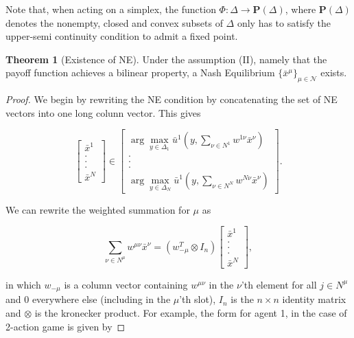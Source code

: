 \documentclass{article}
\theoremstyle{definition}
\newtheorem{theorem}{Theorem}
\newcommand{\agentset}{\mathcal{N}}
\begin{document}
  Note that, when acting on a simplex, the function $\Phi: \Delta \rightarrow \textbf{P}(\Delta)$, where $\textbf{P}(\Delta)$ denotes the nonempty, closed and convex subsets of $\Delta$ only has to satisfy the upper-semi continuity condition to admit a fixed point.

  \begin{theorem}[Existence of NE]
    Under the assumption (II), namely that the payoff function achieves a bilinear property, a
    Nash Equilibrium $\{\bar{x}^\mu\}_{\mu \in \agentset}$ exists.
  \end{theorem}

  \begin{proof}
    We begin by rewriting the NE condition by concatenating the set of NE vectors into one long colunn vector. This gives

    \begin{equation}
      \begin{bmatrix}
        \bar{x}^1 \\ . \\ . \\ . \\ \bar{x}^N
      \end{bmatrix} \in
      \begin{bmatrix}
      \arg\max_{y \in \Delta_1} \bar{u}^1(y, \sum_{\nu \in N^1} w^{1 \nu} \bar{x}^\nu) \\ . \\ . \\ . \\ \arg\max_{y \in \Delta_N} \bar{u}^1(y, \sum_{\nu \in N^N} w^{N \nu} \bar{x}^\nu)
      \end{bmatrix} .
    \end{equation}

    We can rewrite the weighted summation for $\mu$ as

    \begin{equation}
      \sum_{\nu \in N^\mu} w^{\mu \nu} \bar{x}^\nu = (w_{-\mu}^T \otimes I_n) \begin{bmatrix}
        \bar{x}^1 \\ . \\ . \\ . \\ \bar{x}^N
      \end{bmatrix},
    \end{equation}
  
    in which $w_{-\mu}$ is a column vector containing $w^{\mu \nu}$ in the $\nu$'th element for all $j \in N^\mu$ and 0 everywhere else (including in the $\mu$'th slot), $I_n$ is the $n \times n$ identity matrix and $\otimes$ is the kronecker product. For example, the form for agent 1, in the case of 2-action game is given by


\end{proof}
\end{document}
